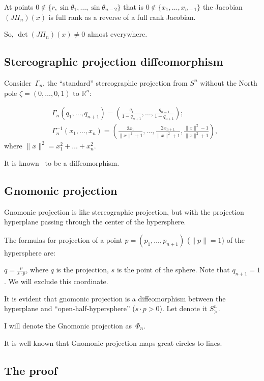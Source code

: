 \documentclass[oneside,draft]{amsart}
\begin{document}
At points $0\notin\{r,\sin\theta_1,\dots,\sin\theta_{n-2}\}$ that is $0\notin\{x_1,\dots,x_{n-1}\}$ the Jacobian $(J\Pi_n)(x)$
is full rank as a reverse of a full rank Jacobian.

So, $\det (J\Pi_n)(x)\ne 0$ almost everywhere.

\subsection{Stereographic projection diffeomorphism}

Consider~$\Gamma_n$, the ``standard'' stereographic projection from $S^n$ without the North pole $\zeta=(0,\dots,0,1)$ to $\mathbb{R}^n$:

\begin{align*}
&\Gamma_n(q_1,\dots,q_{n+1}) = \left(\frac{q_1}{1-q_{n+1}},\dots,\frac{q_{n-1}}{1-q_{n+1}}\right);\\
&\Gamma_n^{-1}(x_1,\dots,x_n) = \left(\frac{2x_1}{\lVert x\rVert^2+1},\dots,\frac{2x_{n+1}}{\lVert x\rVert^2+1},\frac{\lVert x\rVert^2-1}{\lVert x\rVert^2+1}\right),
\end{align*}
where $\lVert x\rVert^2 = x_1^2+\dots+x_n^2$.

It is known~\cite{stereo} to be a diffeomorphism.

\subsection{Gnomonic projection}

Gnomonic projection is like stereographic projection, but with the projection hyperplane passing through the center of the hypersphere.


The formulas for projection of a point $p=(p_1,\dots,p_{n+1})$ ($\lVert p\rVert = 1$) of the hypersphere are:

$q=\frac{p}{s\cdot p}$, where $q$ is the projection, $s$ is the point of the sphere. Note that $q_{n+1}=1$. We will exclude this coordinate.

It is evident  that gnomonic projection is a diffeomorphism between the hyperplane and ``open-half-hy\-per\-sphe\-re'' ($s\cdot p>0$). Let denote it $S^n_{>}$.

I will denote the Gnomonic projection as~$\Phi_n$.

It is well known that Gnomonic projection maps great circles to lines.

\subsection{The proof}
\end{document}
